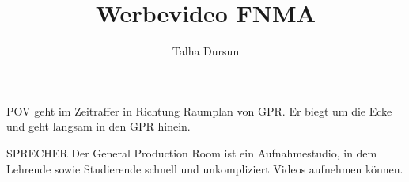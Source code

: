 \documentclass{screenplay}
\title{Werbevideo FNMA}
\author{Talha Dursun}
\begin{document}
	\nicholl
	
	\fadein
	
	POV geht im Zeitraffer in Richtung Raumplan von GPR. Er biegt um die Ecke und geht langsam in den GPR hinein.
	
	\begin{dialogue}{SPRECHER}
		Der General Production Room ist ein Aufnahmestudio, in dem Lehrende sowie Studierende schnell und unkompliziert Videos aufnehmen können.
	\end{dialogue}
	
	
	\fadeout
\end{document}
